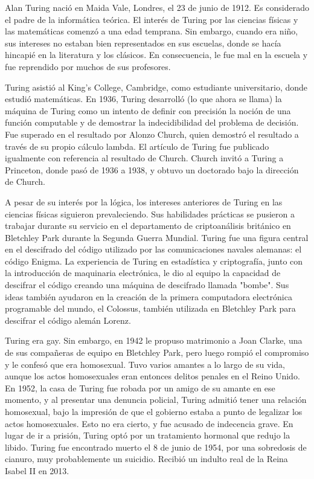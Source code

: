 \documentclass[../../../include/open-logic-section]{subfiles}
\begin{document}


Alan Turing nació en Maida Vale, Londres, el 23 de junio de 1912. Es considerado el padre de la informática teórica. El interés de Turing por las ciencias físicas y las matemáticas comenzó a una edad temprana. Sin embargo, cuando era niño, sus intereses no estaban bien representados en sus escuelas, donde se hacía hincapié en la literatura y los clásicos. En consecuencia, le fue mal en la escuela y fue reprendido por muchos de sus profesores.


Turing asistió al King's College, Cambridge, como estudiante universitario, donde estudió matemáticas. En 1936, Turing desarrolló (lo que ahora se llama) la máquina de Turing como un intento de definir con precisión la noción de una función computable y de demostrar la indecidibilidad del problema de decisión. Fue superado en el resultado por Alonzo Church, quien demostró el resultado a través de su propio cálculo lambda. El artículo de Turing fue publicado igualmente con referencia al resultado de Church. Church invitó a Turing a Princeton, donde pasó de 1936 a 1938, y obtuvo un doctorado bajo la dirección de Church.

A pesar de su interés por la lógica, los intereses anteriores de Turing en las ciencias físicas siguieron prevaleciendo. Sus habilidades prácticas se pusieron a trabajar durante su servicio en el departamento de criptoanálisis británico en Bletchley Park durante la Segunda Guerra Mundial. Turing fue una figura central en el descifrado del código utilizado por las comunicaciones navales alemanas: el código Enigma. La experiencia de Turing en estadística y criptografía, junto con la introducción de maquinaria electrónica, le dio al equipo la capacidad de descifrar el código creando una máquina de descifrado llamada "bombe". Sus ideas también ayudaron en la creación de la primera computadora electrónica programable del mundo, el Colossus, también utilizada en Bletchley Park para descifrar el código alemán Lorenz.

Turing era gay. Sin embargo, en 1942 le propuso matrimonio a Joan Clarke, una de sus compañeras de equipo en Bletchley Park, pero luego rompió el compromiso y le confesó que era homosexual. Tuvo varios amantes a lo largo de su vida, aunque los actos homosexuales eran entonces delitos penales en el Reino Unido. En 1952, la casa de Turing fue robada por un amigo de su amante en ese momento, y al presentar una denuncia policial, Turing admitió tener una relación homosexual, bajo la impresión de que el gobierno estaba a punto de legalizar los actos homosexuales. Esto no era cierto, y fue acusado de indecencia grave. En lugar de ir a prisión, Turing optó por un tratamiento hormonal que redujo la libido. Turing fue encontrado muerto el 8 de junio de 1954, por una sobredosis de cianuro, muy probablemente un suicidio. Recibió un indulto real de la Reina Isabel II en 2013.
\end{document}
